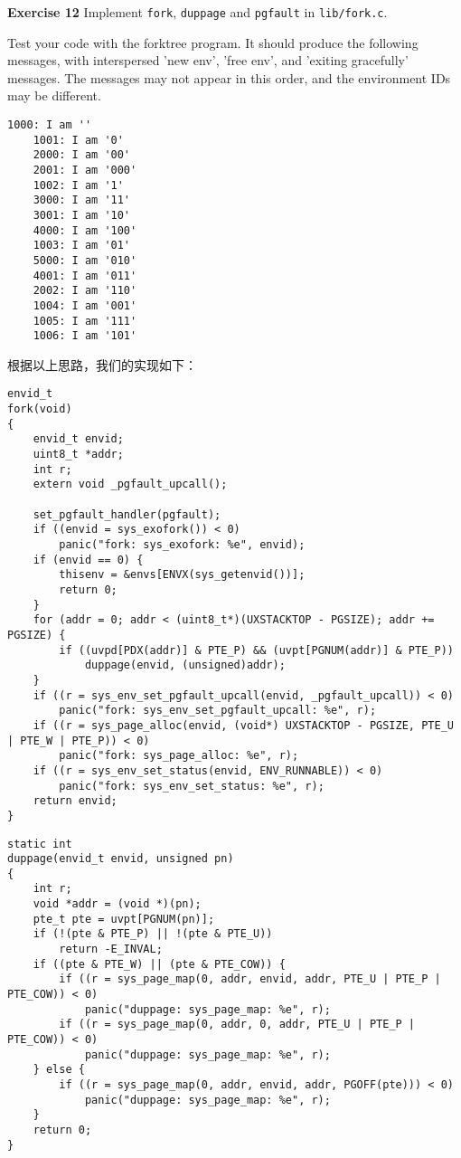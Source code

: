 \documentclass[11pt]{article}
\begin{document}
\begin{framed}
\noindent\textbf{Exercise 12} Implement \lstinline|fork|, \lstinline|duppage| and \lstinline|pgfault| in \lstinline|lib/fork.c|.

Test your code with the forktree program. It should produce the following messages, with interspersed 'new env', 'free env', and 'exiting gracefully' messages. The messages may not appear in this order, and the environment IDs may be different.

\begin{lstlisting}[aboveskip=-1.5em,frame=none]
	1000: I am ''
	1001: I am '0'
	2000: I am '00'
	2001: I am '000'
	1002: I am '1'
	3000: I am '11'
	3001: I am '10'
	4000: I am '100'
	1003: I am '01'
	5000: I am '010'
	4001: I am '011'
	2002: I am '110'
	1004: I am '001'
	1005: I am '111'
	1006: I am '101'
\end{lstlisting}
\end{framed}

根据以上思路，我们的实现如下：
\begin{lstlisting}[title=lib/fork.c]
envid_t
fork(void)
{
	envid_t envid;
	uint8_t *addr;
	int r;
	extern void _pgfault_upcall(); 

	set_pgfault_handler(pgfault);
	if ((envid = sys_exofork()) < 0)
		panic("fork: sys_exofork: %e", envid);
	if (envid == 0) {
		thisenv = &envs[ENVX(sys_getenvid())];
		return 0;
	}
	for (addr = 0; addr < (uint8_t*)(UXSTACKTOP - PGSIZE); addr += PGSIZE) {
		if ((uvpd[PDX(addr)] & PTE_P) && (uvpt[PGNUM(addr)] & PTE_P))
			duppage(envid, (unsigned)addr);
	}
	if ((r = sys_env_set_pgfault_upcall(envid, _pgfault_upcall)) < 0)
		panic("fork: sys_env_set_pgfault_upcall: %e", r);
	if ((r = sys_page_alloc(envid, (void*) UXSTACKTOP - PGSIZE, PTE_U | PTE_W | PTE_P)) < 0)
		panic("fork: sys_page_alloc: %e", r);
	if ((r = sys_env_set_status(envid, ENV_RUNNABLE)) < 0)
		panic("fork: sys_env_set_status: %e", r);
	return envid;
}
\end{lstlisting}

\begin{lstlisting}[title=lib/fork.c]
static int
duppage(envid_t envid, unsigned pn)
{
	int r;
	void *addr = (void *)(pn);
	pte_t pte = uvpt[PGNUM(pn)];
	if (!(pte & PTE_P) || !(pte & PTE_U))
	 	return -E_INVAL;
	if ((pte & PTE_W) || (pte & PTE_COW)) {
		if ((r = sys_page_map(0, addr, envid, addr, PTE_U | PTE_P | PTE_COW)) < 0)
			panic("duppage: sys_page_map: %e", r);
		if ((r = sys_page_map(0, addr, 0, addr, PTE_U | PTE_P | PTE_COW)) < 0)
			panic("duppage: sys_page_map: %e", r);
	} else {
		if ((r = sys_page_map(0, addr, envid, addr, PGOFF(pte))) < 0)
			panic("duppage: sys_page_map: %e", r);
	}
	return 0;
}
\end{lstlisting}
\end{document}
